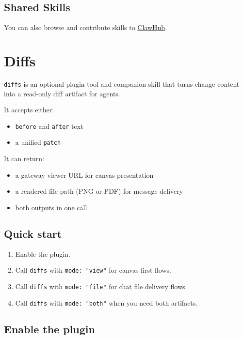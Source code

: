\subsection{Shared Skills}


You can also browse and contribute skills to \href{https://clawhub.com}{ClawHub}.


\clearpage

\section{Diffs}


\texttt{diffs} is an optional plugin tool and companion skill that turns change content into a read-only diff artifact for agents.

It accepts either:

\begin{itemize}
  \item \texttt{before} and \texttt{after} text
  \item a unified \texttt{patch}
\end{itemize}


It can return:

\begin{itemize}
  \item a gateway viewer URL for canvas presentation
  \item a rendered file path (PNG or PDF) for message delivery
  \item both outputs in one call
\end{itemize}


\subsection{Quick start}


\begin{enumerate}
  \item Enable the plugin.
  \item Call \texttt{diffs} with \texttt{mode: "view"} for canvas-first flows.
  \item Call \texttt{diffs} with \texttt{mode: "file"} for chat file delivery flows.
  \item Call \texttt{diffs} with \texttt{mode: "both"} when you need both artifacts.
\end{enumerate}


\subsection{Enable the plugin}



